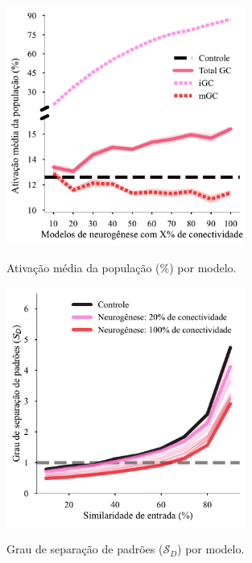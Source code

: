\begin{figure}[H]
    \centering
    \caption{Ativação média da população (\%) por modelo.}
    \includegraphics[width=0.7\textwidth]{figuras/plots/avg_activity}
    \label{fig:avg_activity}
\end{figure}

\begin{figure}
    \centering
    \caption{Grau de separação de padrões ($\mathcal{S}_D$) por modelo.}
    \includegraphics[width=0.7\textwidth]{figuras/plots/pattern_separation}
    \label{fig:pattern_separation}
\end{figure}

